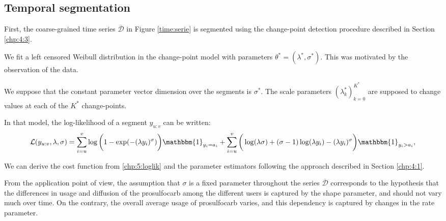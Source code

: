 \subsection{Temporal segmentation}\label{sec:time_pattern}

First, the coarse-grained time series $\overline{\mathcal{D}}$ in Figure \ref{time:serie} is segmented using the change-point detection procedure described in Section \ref{chp:4:3}. 

We fit a left censored Weibull distribution in the change-point model with parameters $\theta^* = (\lambda^*,\sigma^*)$. This was motivated by the observation of the data. 

We suppose that the constant parameter vector dimension over the segments is $\sigma^*$. The scale parameters $(\lambda^*_k)_{k = 0}^{K^*}$ are supposed to change values at each of the $K^*$ change-points.    

In that model, the log-likelihood of a segment $y_{u:v}$ can be written:
\begin{equation}\label{chp:5:loglik}
\mathcal{L}(y_{u:v},\lambda,\sigma) = \sum_{i=u}^v\log\bigg(1-\exp(-(\lambda y_i)^\sigma)\bigg)\mathbbm{1}_{y_i=a_i}+\sum_{i=u}^v\bigg(\log(\lambda\sigma)+(\sigma-1)\log(\lambda y_i)-(\lambda y_i)^\sigma\bigg)\mathbbm{1}_{y_i>a_i},
\end{equation}

We can derive the cost function from \eqref{chp:5:loglik} and the parameter estimators following the approach described in Section \ref{chp:4:1}.

From the application point of view, the assumption that $\sigma$ is a fixed parameter throughout the series $\overline{\mathcal{D}}$ corresponds to the hypothesis that the differences in usage and diffusion of the prosulfocarb among the different users is captured by the shape parameter, and should not vary much over time. On the contrary, the overall average usage of prosulfocarb varies, and this dependency is captured by changes in the rate parameter. 


